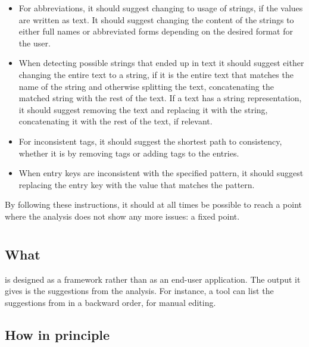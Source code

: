 \begin{itemize}
\item For abbreviations, it should suggest changing to usage of
  strings, if the values are written as text.  It should suggest
  changing the content of the strings to either full names or
  abbreviated forms depending on the desired format for the user.

\item When detecting possible strings that ended up in text it should
  suggest either changing the entire text to a string, if it is the
  entire text that matches the name of the string and otherwise
  splitting the text, concatenating the matched string with the rest
  of the text.  If a text has a string representation, it should
  suggest removing the text and replacing it with the string,
  concatenating it with the rest of the text, if relevant.

\item For inconsistent tags, it should suggest the shortest path to
  consistency, whether it is by removing tags or adding tags to the
  entries.

\item When entry keys are inconsistent with the specified pattern, it
  should suggest replacing the entry key with the value that matches
  the pattern.
\end{itemize}

By following these instructions, it should at all times be possible to
reach a point where the analysis does not show any more issues: a
fixed point.


\section{\orangutan}

\subsection{What}
\label{sec:organizing_orangutan_what}

{\orangutan} is designed as a framework rather than as an end-user
application.  The output it gives is the suggestions from the
analysis.  For instance, a tool can list the suggestions from
{\orangutan} in a backward order, for manual editing.


\subsection{How in principle}
\label{sec:organizing_orangutan_how_principle}


